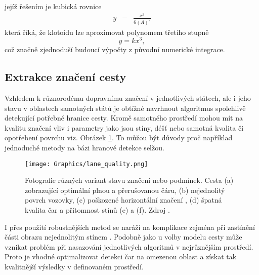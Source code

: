 \documentclass[czech, bc, kky, he, iso690numb]{fasthesis}
\begin{document}
                jejíž řešením je kubická rovnice
                    \begin{eqnarray}
                        y & = & \frac{x^{3}}{6(A)^{2}}
                        \label{eqn:dukaz_aproximace_clothoidu_polynomem_3st}
                    \end{eqnarray}
                která říká, že klotoidu lze aproximovat polynomem třetího stupně
                    \begin{equation}\label{eqn:aproximace_klotoidy}
                        y = k x^{3},
                    \end{equation}
                což značně zjednoduší budoucí výpočty z původní numerické integrace.
                
            \subsection{Extrakce značení cesty}\label{sec:extrakce_znaceni}
                Vzhledem k různorodému dopravnímu značení v jednotlivých státech, ale i jeho stavu v oblastech samotných států je obtížné navrhnout algoritmus spolehlivě detekující potřebné hranice cesty. Kromě samotného prostředí mohou mít na kvalitu značení vliv i parametry jako jsou stíny, déšť nebo samotná kvalita či opotřebení povrchu viz. Obrázek \ref{pic:line_quality}. To můžou být důvody proč například jednoduché metody na bázi hranové detekce selžou. 
                
                	\begin{figure}[ht]
                		\centering
                		\texttt{[image: Graphics/lane\_quality.png]}
                		\caption{Fotografie různých variant stavu značení nebo podmínek. Cesta (a) zobrazující optimální plnou a přerušovanou čáru, (b) nejednolitý povrch vozovky, (c) poškozené horizontální značení , (d) špatná kvalita čar a přítomnost stínů (e) a (f). Zdroj \cite{VIOLET}.}
                		\label{pic:line_quality}
                	\end{figure}
                
                I přes použití robustnějších metod se naráží na komplikace zejména při zastínění části obrazu nejednolitým stínem \cite{VIOLET}. Podobně jako u volby modelu cesty může vznikat problém při nasazování jednotlivých algoritmů v nejrůznějším prostředí. Proto je vhodné optimalizovat detekci čar na omezenou oblast a získat tak kvalitnější výsledky v definovaném prostředí.
                
\end{document}
